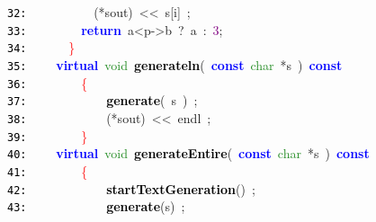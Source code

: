 \documentclass{article}
\begin{document}
\mbox{}\texttt{\textcolor{Black}{32:}} \ \ \ \ \ \ \ \ \ \ \textcolor{BrickRed}{(*}sout\textcolor{BrickRed}{)}\ \textcolor{BrickRed}{\textless{}\textless{}}\ s\textcolor{BrickRed}{[}i\textcolor{BrickRed}{]}\ \textcolor{BrickRed}{;} \\
\mbox{}\texttt{\textcolor{Black}{33:}} \ \ \ \ \ \ \ \ \textbf{\textcolor{Blue}{return}}\ a\textcolor{BrickRed}{\textless{}}p\textcolor{BrickRed}{-\textgreater{}}b\ \textcolor{BrickRed}{?}\ a\ \textcolor{BrickRed}{:}\ \textcolor{Purple}{3}\textcolor{BrickRed}{;} \\
\mbox{}\texttt{\textcolor{Black}{34:}} \ \ \ \ \ \ \textcolor{Red}{\}} \\
\mbox{}\texttt{\textcolor{Black}{35:}} \ \ \ \ \textbf{\textcolor{Blue}{virtual}}\ \textcolor{ForestGreen}{void}\ \textbf{\textcolor{Black}{\label{test.h:35}generateln}}\textcolor{BrickRed}{(}\ \textbf{\textcolor{Blue}{const}}\ \textcolor{ForestGreen}{char}\ \textcolor{BrickRed}{*}s\ \textcolor{BrickRed}{)}\ \textbf{\textcolor{Blue}{const}} \\
\mbox{}\texttt{\textcolor{Black}{36:}} \ \ \ \ \ \ \ \ \textcolor{Red}{\{}\  \\
\mbox{}\texttt{\textcolor{Black}{37:}} \ \ \ \ \ \ \ \ \ \ \ \ \textbf{\textcolor{Black}{generate}}\textcolor{BrickRed}{(}\ s\ \textcolor{BrickRed}{)}\ \textcolor{BrickRed}{;} \\
\mbox{}\texttt{\textcolor{Black}{38:}} \ \ \ \ \ \ \ \ \ \ \ \ \textcolor{BrickRed}{(*}sout\textcolor{BrickRed}{)}\ \textcolor{BrickRed}{\textless{}\textless{}}\ endl\ \textcolor{BrickRed}{;}\  \\
\mbox{}\texttt{\textcolor{Black}{39:}} \ \ \ \ \ \ \ \ \textcolor{Red}{\}} \\
\mbox{}\texttt{\textcolor{Black}{40:}} \ \ \ \ \textbf{\textcolor{Blue}{virtual}}\ \textcolor{ForestGreen}{void}\ \textbf{\textcolor{Black}{\label{test.h:40}generateEntire}}\textcolor{BrickRed}{(}\ \textbf{\textcolor{Blue}{const}}\ \textcolor{ForestGreen}{char}\ \textcolor{BrickRed}{*}s\ \textcolor{BrickRed}{)}\ \textbf{\textcolor{Blue}{const}} \\
\mbox{}\texttt{\textcolor{Black}{41:}} \ \ \ \ \ \ \ \ \textcolor{Red}{\{} \\
\mbox{}\texttt{\textcolor{Black}{42:}} \ \ \ \ \ \ \ \ \ \ \ \ \textbf{\textcolor{Black}{startTextGeneration}}\textcolor{BrickRed}{()}\ \textcolor{BrickRed}{;} \\
\mbox{}\texttt{\textcolor{Black}{43:}} \ \ \ \ \ \ \ \ \ \ \ \ \textbf{\textcolor{Black}{generate}}\textcolor{BrickRed}{(}s\textcolor{BrickRed}{)}\ \textcolor{BrickRed}{;} \\
\end{document}

